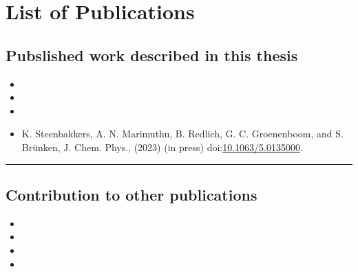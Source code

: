 \chapter{List of Publications}

\section*{Pubslished work described in this thesis}

\begin{itemize}
    \item {}
    \item {}
    \item {}
    \item K. Steenbakkers, A. N. Marimuthu, B. Redlich, G. C. Groenenboom, and S. Br\"unken, J. Chem. Phys., (2023) (in press) doi:\url{10.1063/5.0135000}.
\end{itemize}

\hrule

\section*{Contribution to other publications}
\begin{itemize}
    \item {}
    \item {}
    \item {}
    \item {}
\end{itemize}
